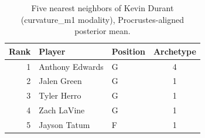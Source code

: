 \begin{table}[htbp]
  \centering\small
  \begin{tabular}{rllc}
    \toprule
    Rank & Player & Position & Archetype \\
    \midrule
    1 & Anthony Edwards & G & 4 \\
    2 & Jalen Green & G & 1 \\
    3 & Tyler Herro & G & 1 \\
    4 & Zach LaVine & G & 1 \\
    5 & Jayson Tatum & F & 1 \\
    \bottomrule
  \end{tabular}
  \caption{Five nearest neighbors of Kevin Durant (curvature_m1 modality), Procrustes-aligned posterior mean.}
  \label{tab:Kevin_Durant_neighbors_curvature_m1}
\end{table}

